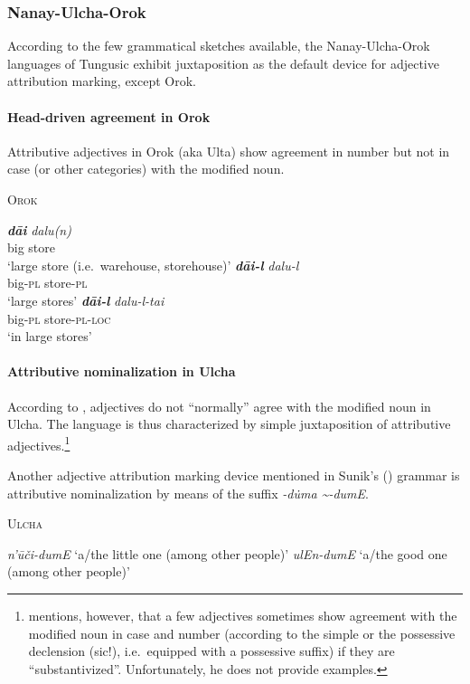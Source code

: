 \subsubsection{Nanay-Ulcha-Orok}
According to the few grammatical sketches available, the Nanay-Ulcha-Orok languages of Tungusic exhibit juxtaposition as the default device for adjective attribution marking, except Orok.

\paragraph{Head-driven agreement in Orok} Attributive adjectives in Orok (aka Ulta) show agreement in number but not in case (or other categories) with the modified noun.
\begin{exe}
\ex \textsc{Orok} \citep[55]{petrova1967}
\begin{xlist}
\ex
\gll \textit{\textbf{dāi}} \textit{dalu(n)}\\
	big store\\
\glt ‘large store (i.e.~warehouse, storehouse)’
\ex 
\gll	\textit{\textbf{dāi-l}} \textit{dalu-l}\\
	big-\textsc{pl} store-\textsc{pl}\\
\glt	‘large stores’
\ex 
\gll	\textit{\textbf{dāi-l}} \textit{dalu-l-tai}\\
	big-\textsc{pl} store-\textsc{pl}-\textsc{loc}\\
\glt	‘in large stores’
\end{xlist}
\end{exe}

\paragraph{Attributive nominalization in Ulcha}
According to \citet[36, 52–53]{sunik1985}, adjectives do not “normally” agree with the modified noun in Ulcha. The language is thus characterized by simple juxtaposition of attributive adjectives.\footnote{\citet[36]{sunik1985} mentions, however, that a few adjectives sometimes show agreement with the modified noun in case and number (according to the simple or the possessive declension (sic!), i.e.~equipped with a possessive suffix) if they are “substantivized”. Unfortunately, he does not provide examples.}

Another adjective attribution marking device mentioned in Sunik's (\citeyear{sunik1985}) grammar is attributive nominalization by means of the suffix \textit{-d\.uma \textasciitilde-dumE}.
\begin{exe}
\ex \textsc{Ulcha} \citep[38]{sunik1985}
\begin{xlist}
\ex \textit{n'ūči-dumE} ‘a/the little one (among other people)’
\ex \textit{ulEn-dumE} ‘a/the good one (among other people)’
\end{xlist}
\end{exe}

